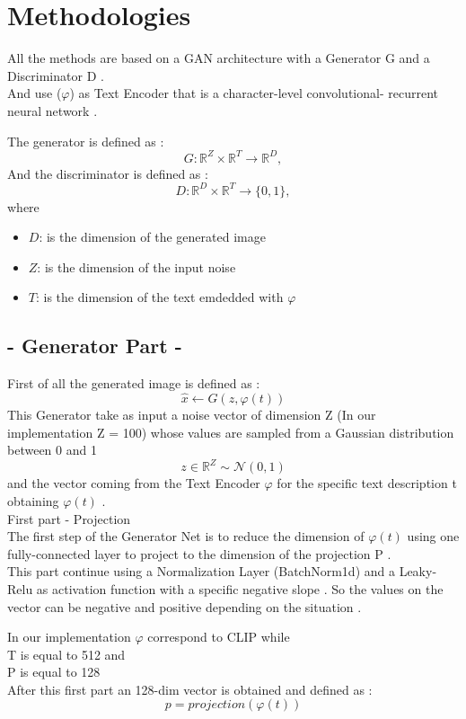 \section*{ Methodologies }
All the methods are based on a GAN architecture with a Generator G 
and a Discriminator D . \\ 
And use ($\varphi$) as Text Encoder that is a character-level convolutional-
recurrent neural network .

The generator is defined as :
\[
G : \mathbb{R}^Z \times \mathbb{R}^{T} \rightarrow \mathbb{R}^D,
\]
And the discriminator is defined as :  
\[
D : \mathbb{R}^D \times \mathbb{R}^{T} \rightarrow \{0, 1\},
\]
where 
\begin{itemize}
    \item ${D}$: is the dimension of the generated image
    \item ${Z}$: is the dimension of the input noise 
    \item ${T}$: is the dimension of the text emdedded with $\varphi$
\end{itemize}

\subsection*{- Generator Part -}
First of all the generated image is defined as :
\[
\hat{x} \leftarrow G(z, \varphi(t))
\]
This Generator take as input a noise vector of dimension Z 
(In our implementation Z = 100) whose values are sampled from a Gaussian 
distribution between 0 and 1
\\
\[
z \in \mathbb{R}^Z \sim \mathcal{N}(0, 1)
\]
and the vector coming from the Text Encoder $\varphi$ for the specific 
text description t obtaining $\varphi(t)$ .
\\
First part - Projection \\
The first step of the Generator Net is to reduce the dimension of 
$\varphi(t)$ using one fully-connected layer to project 
to the dimension of the projection P . \\
This part continue using a Normalization Layer (BatchNorm1d)
and a Leaky-Relu as activation function with a specific negative slope .  
So the values on the vector can be negative and positive depending on the 
situation .

In our implementation $\varphi$ correspond to CLIP while \\
T is equal to 512 and \\
P is equal to 128 \\
After this first part an 128-dim vector is obtained and defined as :
\[
 p = projection( \varphi(t) )
\]

